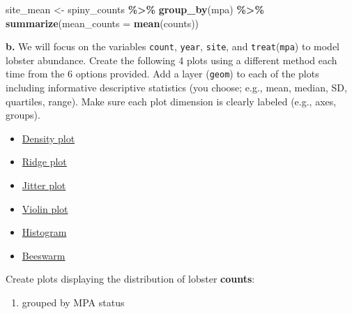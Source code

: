 \documentclass[
]{article}
\newenvironment{Shaded}{\begin{snugshade}}{\end{snugshade}}
\newcommand{\AttributeTok}[1]{\textcolor[rgb]{0.13,0.29,0.53}{#1}}
\newcommand{\FunctionTok}[1]{\textcolor[rgb]{0.13,0.29,0.53}{\textbf{#1}}}
\newcommand{\NormalTok}[1]{#1}
\newcommand{\OtherTok}[1]{\textcolor[rgb]{0.56,0.35,0.01}{#1}}
\newcommand{\SpecialCharTok}[1]{\textcolor[rgb]{0.81,0.36,0.00}{\textbf{#1}}}
\providecommand{\tightlist}{%
  \setlength{\itemsep}{0pt}\setlength{\parskip}{0pt}}
\begin{document}
\begin{Shaded}
\begin{Highlighting}[]
\NormalTok{site\_mean }\OtherTok{\textless{}{-}}\NormalTok{ spiny\_counts }\SpecialCharTok{\%\textgreater{}\%}
  \FunctionTok{group\_by}\NormalTok{(mpa) }\SpecialCharTok{\%\textgreater{}\%}
  \FunctionTok{summarize}\NormalTok{(}\AttributeTok{mean\_counts =} \FunctionTok{mean}\NormalTok{(counts))}
\end{Highlighting}
\end{Shaded}

\textbf{b.} We will focus on the variables \texttt{count},
\texttt{year}, \texttt{site}, and \texttt{treat}(\texttt{mpa}) to model
lobster abundance. Create the following 4 plots using a different method
each time from the 6 options provided. Add a layer (\texttt{geom}) to
each of the plots including informative descriptive statistics (you
choose; e.g., mean, median, SD, quartiles, range). Make sure each plot
dimension is clearly labeled (e.g., axes, groups).

\begin{itemize}
\tightlist
\item
  \href{https://r-charts.com/distribution/density-plot-group-ggplot2}{Density
  plot}
\item
  \href{https://r-charts.com/distribution/ggridges/}{Ridge plot}
\item
  \href{https://ggplot2.tidyverse.org/reference/geom_jitter.html}{Jitter
  plot}
\item
  \href{https://r-charts.com/distribution/violin-plot-group-ggplot2}{Violin
  plot}
\item
  \href{https://r-charts.com/distribution/histogram-density-ggplot2/}{Histogram}
\item
  \href{https://r-charts.com/distribution/beeswarm/}{Beeswarm}
\end{itemize}

Create plots displaying the distribution of lobster \textbf{counts}:

\begin{enumerate}
\def\labelenumi{\arabic{enumi})}
\tightlist
\item
  grouped by MPA status
\end{enumerate}
\end{document}
